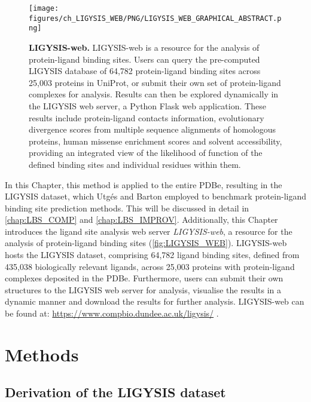 \begin{figure}[htb!]
    \centering
    \texttt{[image: figures/ch\_LIGYSIS\_WEB/PNG/LIGYSIS\_WEB\_GRAPHICAL\_ABSTRACT.png]}
    \caption[LIGYSIS-web]{\textbf{LIGYSIS-web.} LIGYSIS-web is a resource for the analysis of protein-ligand binding sites. Users can query the pre-computed LIGYSIS database of 64,782 protein-ligand binding sites across 25,003 proteins in UniProt, or submit their own set of protein-ligand complexes for analysis. Results can then be explored dynamically in the LIGYSIS web server, a Python Flask web application. These results include protein-ligand contacts information, evolutionary divergence scores from multiple sequence alignments of homologous proteins, human missense enrichment scores and solvent accessibility, providing an integrated view of the likelihood of function of the defined binding sites and individual residues within them.}
    \label{fig:LIGYSIS_WEB}
\end{figure}

In this Chapter, this method is applied to the entire PDBe, resulting in the LIGYSIS dataset, which Utgés and Barton \cite{UTGES_2024_LBSCOMP} employed to benchmark protein-ligand binding site prediction methods. This will be discussed in detail in \autoref{chap:LBS_COMP} and \autoref{chap:LBS_IMPROV}. Additionally, this Chapter introduces the ligand site analysis web server \textit{LIGYSIS-web}, a resource for the analysis of protein-ligand binding sites (\autoref{fig:LIGYSIS_WEB}). LIGYSIS-web hosts the LIGYSIS dataset, comprising 64,782 ligand binding sites, defined from 435,038 biologically relevant ligands, across 25,003 proteins with protein-ligand complexes deposited in the PDBe. Furthermore, users can submit their own structures to the LIGYSIS web server for analysis, visualise the results in a dynamic manner and download the results for further analysis. LIGYSIS-web can be found at: \url{https://www.compbio.dundee.ac.uk/ligysis/} \cite{LIGYSIS_SERVER}.

\section{Methods}

\subsection{Derivation of the LIGYSIS dataset}

